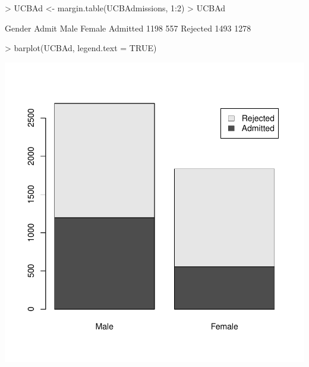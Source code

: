 \documentclass[12pt,letterpaper,final]{article}
\begin{document}
\begin{Schunk}
\begin{Sinput}
> UCBAd <- margin.table(UCBAdmissions, 1:2)
> UCBAd
\end{Sinput}
\begin{Soutput}
          Gender
Admit      Male Female
  Admitted 1198    557
  Rejected 1493   1278
\end{Soutput}
\begin{Sinput}
> barplot(UCBAd, legend.text = TRUE)
\end{Sinput}
\end{Schunk}
\includegraphics{lect_main-012}
\end{document}
